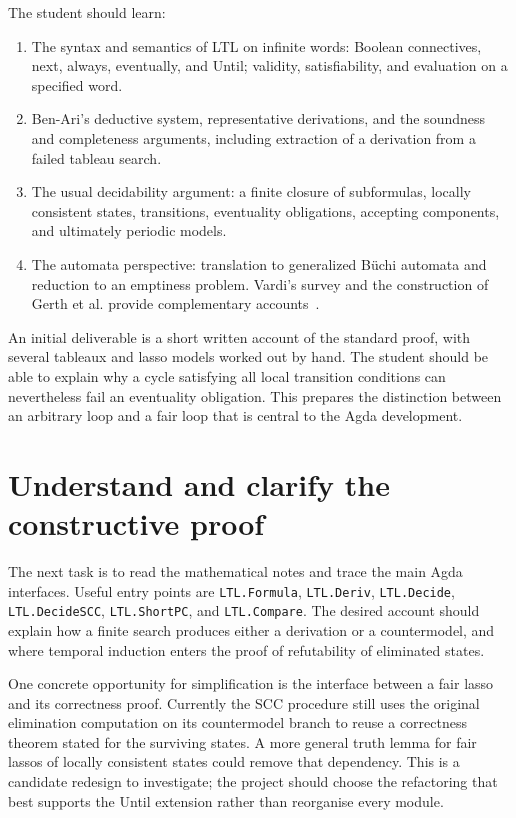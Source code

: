 \documentclass[11pt,a4paper]{article}
\begin{document}
The student should learn:
\begin{enumerate}
\item The syntax and semantics of LTL on infinite words: Boolean
connectives, next, always, eventually, and Until; validity,
satisfiability, and evaluation on a specified word.
\item Ben-Ari's deductive system, representative derivations, and the
soundness and completeness arguments, including extraction of a
derivation from a failed tableau search.
\item The usual decidability argument: a finite closure of subformulas,
locally consistent states, transitions, eventuality obligations,
accepting components, and ultimately periodic models.
\item The automata perspective: translation to generalized B\"uchi
automata and reduction to an emptiness problem. Vardi's survey
and the construction of Gerth et al. provide complementary
accounts~\cite{vardi,gerth}.
\end{enumerate}

An initial deliverable is a short written account of the standard proof,
with several tableaux and lasso models worked out by hand. The student
should be able to explain why a cycle satisfying all local transition
conditions can nevertheless fail an eventuality obligation. This prepares
the distinction between an arbitrary loop and a fair loop that is central
to the Agda development.

\section{Understand and clarify the constructive proof}

The next task is to read the mathematical notes and trace the main Agda
interfaces. Useful entry points are \texttt{LTL.Formula},
\texttt{LTL.Deriv}, \texttt{LTL.Decide}, \texttt{LTL.DecideSCC},
\texttt{LTL.ShortPC}, and \texttt{LTL.Compare}.
The desired account should explain how a finite search produces either
a derivation or a countermodel, and where temporal induction enters the
proof of refutability of eliminated states.

One concrete opportunity for simplification is the interface between a
fair lasso and its correctness proof. Currently the SCC procedure still
uses the original elimination computation on its countermodel branch to
reuse a correctness theorem stated for the surviving states. A more
general truth lemma for fair lassos of locally consistent states could
remove that dependency. This is a candidate redesign to investigate;
the project should choose the refactoring that best supports the Until
extension rather than reorganise every module.
\end{document}
